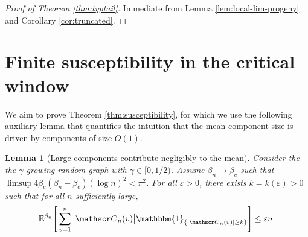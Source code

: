 \documentclass[a4paper, a4wide, 10pt, reqno]{amsart}
\theoremstyle{plain}
\newtheorem{lemma}[theorem]{Lemma}
\theoremstyle{definition}
\numberwithin{equation}{section}
\newcommand{\E}{\mathbb E}
\newcommand{\sC}{{\mathscr C}}
\newcommand{\ind}[1]{\mathbbm{1}_{\{#1\}}}
\begin{document}
 \begin{proof}[Proof of Theorem \ref{thm:typtail}]
     Immediate from Lemma \ref{lem:local-lim-progeny} and Corollary \ref{cor:truncated}.
 \end{proof}
 
 \section{Finite susceptibility in the critical window}\label{sec:sus}
We aim to prove Theorem \ref{thm:susceptibility}, for which we use the following auxiliary lemma that quantifies the intuition that the mean component size is driven by components of size $O(1)$.
\begin{lemma}[Large components contribute negligibly to the mean]\label{lem:negligible}
    Consider the the $\gamma$-growing random graph with $\gamma\in[0, 1/2)$. Assume $\beta_n\to\beta_c$ such that $\limsup4\beta_c(\beta_n-\beta_c)(\log n)^2<\pi^2$. For all $\varepsilon>0$, there exists $k=k(\varepsilon)>0$ such that for all $n$ sufficiently large,
    \[
    \E^{\beta_n}\Bigg[\sum_{v=1}^n \big|\sC_n(v)\big |\ind{|\sC_n(v)|\ge k}\Bigg] \le \varepsilon n.
    \]
\end{lemma}
\end{document}
